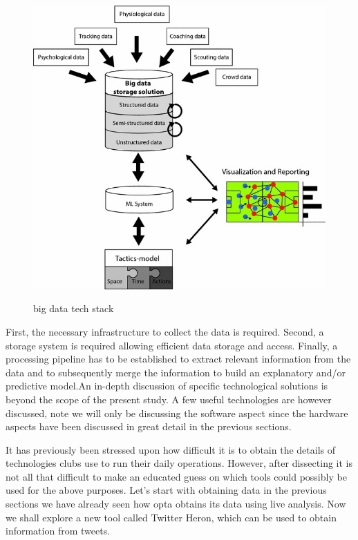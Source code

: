 \documentclass[sigconf]{acmart}
\begin{document}
\begin{figure}[!ht]
  \centering\includegraphics[width=\columnwidth]{images/stack.jpg}
  \caption{big data tech stack}\label{f:big data tech stack}
  \cite{Rein2016}
\end{figure} 


First, the necessary infrastructure to collect the data is required. Second, a storage system is required allowing efficient data storage and access. Finally, a processing pipeline has to be established to extract relevant information from the data and to subsequently merge the information to build an explanatory and/or predictive model\cite{Rein2016}.An in-depth discussion of specific technological solutions is beyond the scope of the present study. A few useful technologies are however discussed, note we will only be discussing the software aspect since the hardware aspects have been discussed in great detail in the previous sections.

It has previously been stressed upon how difficult it is to obtain the details of technologies clubs use to run their daily operations. However, after dissecting it is not all that difficult to make an educated guess on which tools could possibly be used for the above purposes. Let's start with obtaining data in the previous sections we have already seen how opta obtains its data using live analysis\cite{Bialik2014}. Now we shall explore a new tool called Twitter Heron, which can be used to obtain information from tweets.
\end{document}

